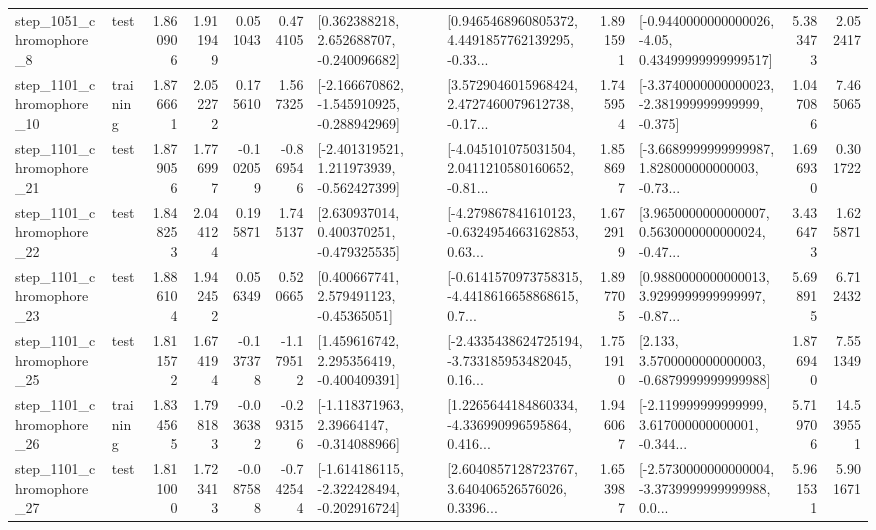 \begin{tabular}{llrrrrllrlrr}
  step\_1051\_chromophore\_8 &      test &      1.860906 &    1.911949 &      0.051043 &  0.474105 &    [0.362388218, 2.652688707, -0.240096682] &  [0.9465468960805372, 4.4491857762139295, -0.33... &       1.891591 &  [-0.9440000000000026, -4.05, 0.43499999999999517] &            5.383473 &          2.052417 \\
 step\_1101\_chromophore\_10 &  training &      1.876661 &    2.052272 &      0.175610 &  1.567325 &  [-2.166670862, -1.545910925, -0.288942969] &  [3.5729046015968424, 2.4727460079612738, -0.17... &       1.745954 &  [-3.3740000000000023, -2.381999999999999, -0.375] &            1.047086 &          7.465065 \\
 step\_1101\_chromophore\_21 &      test &      1.879056 &    1.776997 &     -0.102059 & -0.869546 &   [-2.401319521, 1.211973939, -0.562427399] &  [-4.045101075031504, 2.0411210580160652, -0.81... &       1.858697 &  [-3.6689999999999987, 1.828000000000003, -0.73... &            1.696930 &          0.301722 \\
 step\_1101\_chromophore\_22 &      test &      1.848253 &    2.044124 &      0.195871 &  1.745137 &    [2.630937014, 0.400370251, -0.479325535] &  [-4.279867841610123, -0.6324954663162853, 0.63... &       1.672919 &  [3.9650000000000007, 0.5630000000000024, -0.47... &            3.436473 &          1.625871 \\
 step\_1101\_chromophore\_23 &      test &      1.886104 &    1.942452 &      0.056349 &  0.520665 &     [0.400667741, 2.579491123, -0.45365051] &  [-0.6141570973758315, -4.4418616658868615, 0.7... &       1.897705 &  [0.9880000000000013, 3.9299999999999997, -0.87... &            5.698915 &          6.712432 \\
 step\_1101\_chromophore\_25 &      test &      1.811572 &    1.674194 &     -0.137378 & -1.179512 &    [1.459616742, 2.295356419, -0.400409391] &  [-2.4335438624725194, -3.733185953482045, 0.16... &       1.751910 &   [2.133, 3.5700000000000003, -0.6879999999999988] &            1.876940 &          7.551349 \\
 step\_1101\_chromophore\_26 &  training &      1.834565 &    1.798183 &     -0.036382 & -0.293156 &    [-1.118371963, 2.39664147, -0.314088966] &  [1.2265644184860334, -4.336990996595864, 0.416... &       1.946067 &  [-2.119999999999999, 3.617000000000001, -0.344... &            5.719706 &         14.539551 \\
 step\_1101\_chromophore\_27 &      test &      1.811000 &    1.723413 &     -0.087588 & -0.742544 &  [-1.614186115, -2.322428494, -0.202916724] &  [2.6040857128723767, 3.640406526576026, 0.3396... &       1.653987 &  [-2.5730000000000004, -3.3739999999999988, 0.0... &            5.961531 &          5.901671 \\

\end{tabular}
